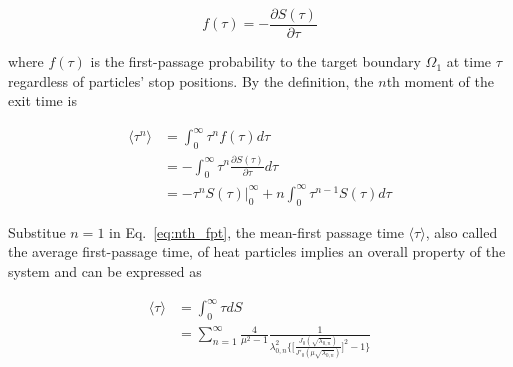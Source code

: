 \begin{equation}\label{eq:pdf_fpt}
  f(\tau) = - \frac{\partial S(\tau)}{\partial \tau}
\end{equation}

where $f(\tau)$ is the first-passage probability to the target
boundary $\Omega_1$ at time $\tau$ regardless of particles' stop
positions. By the definition, the $n$th moment of the exit time
\cite{redner2001guide} is

\begin{equation}\label{eq:nth_fpt}
  \begin{split}
    \langle \tau^n \rangle &= \int_{0}^{\infty} \tau^n f(\tau) d\tau \\
    &= - \int_{0}^{\infty} \tau^n  \frac{\partial S(\tau)}{\partial \tau} d\tau \\
    &= -\tau^n S(\tau) |_{0}^{\infty} + n\int_{0}^{\infty} \tau^{n-1}S(\tau) d\tau
\end{split}
\end{equation}


Substitue $n=1$ in Eq.~\ref{eq:nth_fpt}, the mean-first passage time
$\langle \tau \rangle$, also called the average first-passage time, of
heat particles implies an overall property of the system and can be
expressed as

\begin{equation}\label{eq:mfpt}
  \begin{split}
    \langle \tau \rangle &= \int_{0}^{\infty} \tau dS\\
    &=\sum_{n=1}^{\infty} \frac{4}{\mu^2 - 1}
    \frac{1}{\lambda^2_{0,n}\bigg\{\bigg[\frac{J_0(\sqrt{\lambda_{0,n}})}{J'_0(\mu\sqrt{\lambda_{0,n}})}\bigg]^2
      -1\bigg\}}
  \end{split}
\end{equation}

